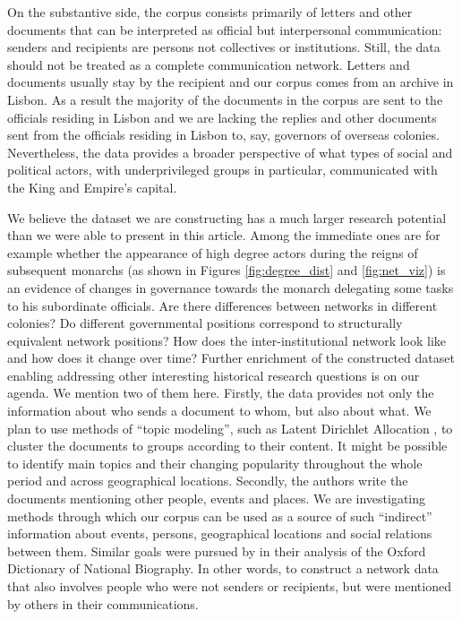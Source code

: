 \documentclass{article}
\begin{document}
On the substantive side, the corpus consists primarily of letters and other documents that can be interpreted as official but interpersonal communication: senders and recipients are persons not collectives or institutions. Still, the data should not be treated as a complete communication network. Letters and documents usually stay by the recipient and our corpus comes from an archive in Lisbon. As a result the majority of the documents in the corpus are sent to the officials residing in Lisbon and we are lacking the replies and other documents sent from the officials residing in Lisbon to, say, governors of overseas colonies. Nevertheless, the data provides a broader perspective of what types of social and political actors, with underprivileged groups in particular, communicated with the King and Empire's capital.

We believe the dataset we are constructing has a much larger research potential than we were able to present in this article. Among the immediate ones are for example whether the appearance of high degree actors during the reigns of subsequent monarchs (as shown in Figures \ref{fig:degree_dist} and \ref{fig:net_viz}) is an evidence of changes in governance towards the monarch delegating some tasks to his subordinate officials. Are there differences between networks in different colonies? Do different governmental positions correspond to structurally equivalent network positions? How does the inter-institutional network look like and how does it change over time? Further enrichment of the constructed dataset enabling addressing other interesting historical research questions is on our agenda. We mention two of them here. Firstly, the data provides not only the information about who sends a document to whom, but also about what. We plan to use methods of ``topic modeling'', such as Latent Dirichlet Allocation \cite{blei_latent_2003}, to cluster the documents to groups according to their content. It might be possible to identify main topics and their changing popularity throughout the whole period and across geographical locations. Secondly, the authors write the documents mentioning other people, events and places. We are investigating methods through which our corpus can be used as a source of such “indirect” information about events, persons, geographical locations and social relations between them. Similar goals were pursued by \cite{warren_six_2016} in their analysis of the Oxford Dictionary of National Biography. In other words, to construct a network data that also involves people who were not senders or recipients, but were mentioned by others in their communications.
\end{document}
